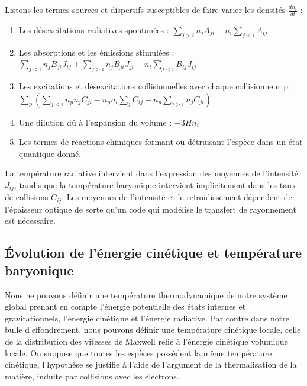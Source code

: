 \documentclass[10pt, a4paper]{report}
\numberwithin{equation}{subsection}
\begin{document}
Listons les termes sources et dispersifs susceptibles de faire varier les densités $\frac{dn_i}{dt}$ :\\

\begin{enumerate}
	\item Les désexcitations radiatives spontanées : $\sum\limits_{j>i} n_jA_{ji}-n_i\sum\limits_{j<i} A_{ij}$
	\item Les absorptions et les émissions stimulées : $\sum\limits_{j<i} n_jB_{ji}J_{ij}+\sum\limits_{j>i} n_jB_{ji}J_{ji}-n_i\sum\limits_{j<i}B_{ij}J_{ij}$
	\item Les excitations et désexcitations collisionnelles avec chaque collisionneur p : \\ $\sum\limits_p\left(\sum\limits_{j<i}n_p n_j C_{ji}-n_pn_i\sum\limits_j C_{ij}+n_p\sum\limits_{j>i}n_j C_{ji}\right)$
	\item Une dilution dû à l'expansion du volume : $-3Hn_i$\\
	\item Les termes de réactions chimiques formant ou détruisant l'espèce dans un état quantique donné.
\end{enumerate}
\medskip
\normalsize
La température radiative intervient dans l'expression des moyennes de l'intensité $J_{ij}$, tandis que la température baryonique intervient implicitement dans les taux de collisions $C_{ij}$. Les moyennes de l'intensité et le refroidissement dépendent de l'épaisseur optique de sorte qu'un code qui modélise le transfert de rayonnement est nécessaire. 
\subsection{\uppercase{é}volution de l'énergie cinétique et température baryonique}
Nous ne pouvons définir une température thermodynamique de notre système global prenant en compte l'énergie potentielle des états internes et gravitationnels, l'énergie cinétique et l'énergie radiative. Par contre dans notre bulle d'effondrement, nous pouvons définir une température cinétique locale, celle de la distribution des vitesses de Maxwell relié à l'énergie cinétique volumique locale. On suppose que toutes les espèces possèdent la même température cinétique, l'hypothèse se justifie à l'aide de l'argument de la thermalisation de la matière, induite par collisions avec les électrons. 
\bigskip
\large
\end{document}
